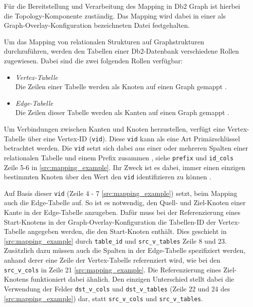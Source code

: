 Für die Bereitstellung und Verarbeitung des Mapping in Db2 Graph ist hierbei die Topology-Komponente zuständig. Das Mapping wird dabei in einer als Graph-Overlay-Konfiguration bezeichneten Datei festgehalten.  

Um das Mapping von relationalen Strukturen auf Graphstrukturen durchzuführen, werden den Tabellen einer Db2-Datenbank verschiedene Rollen zugewiesen. Dabei sind die zwei folgenden Rollen verfügbar:
\begin{itemize}
    \item \textit{Vertex-Tabelle}\\Die Zeilen einer Tabelle werden als Knoten auf einen Graph gemappt \cite{sigmod_tian, yt_tian}.
    \item \textit{Edge-Tabelle}\\Die Zeilen dieser Tabelle werden als Kanten auf einen Graph gemappt \cite{sigmod_tian, yt_tian}.
\end{itemize}

Um Verbindungen zwischen Kanten und Knoten herzustellen, verfügt eine Vertex-Tabelle über eine Vertex-ID (\texttt{\acs{vid}}). Diese \texttt{\acs{vid}} kann als eine Art Primärschlüssel betrachtet werden. Die \texttt{\acs{vid}} setzt sich dabei aus einer oder mehreren Spalten einer relationalen Tabelle und einem Prefix zusammen \cite{sigmod_tian, yt_tian}, siehe \texttt{prefix} und \texttt{id\_cols} Zeile 5-6 in \autoref{src:mapping_example}. Ihr Zweck ist es dabei, immer einen einzigen bestimmten Knoten über den Wert den \texttt{\acs{vid}} identifizieren zu können \cite{sigmod_tian, yt_tian}. 

Auf Basis dieser \texttt{\acs{vid}} (Zeile 4 - 7 \autoref{src:mapping_example}) setzt, beim Mapping auch die Edge-Tabelle auf. So ist es notwendig, den Quell- und Ziel-Knoten einer Kante in der Edge-Tabelle anzugeben. Dafür muss bei der Referenzierung eines Start-Knotens in der Graph-Overlay-Konfiguration die Tabellen-ID der Vertex-Tabelle angegeben werden, die den Start-Knoten enthält. Dies geschieht in \autoref{src:mapping_example} durch \texttt{table\_id} und \texttt{src\_v\_tables} Zeile 8 und 23. Zusätzlich dazu müssen auch die Spalten in der Edge-Tabelle spezifiziert werden, anhand derer eine Zeile der Vertex-Tabelle referenziert wird, wie bei den \texttt{src\_v\_cols} in Zeile 21 \autoref{src:mapping_example}. Die Referenzierung eines Ziel-Knotens funktioniert dabei ähnlich. Den einzigen Unterschied stellt dabei die Verwendung der Felder \texttt{dst\_v\_cols} und \texttt{dst\_v\_tables} (Zeile 22 und 24 des \autoref{src:mapping_example}) dar, statt \texttt{src\_v\_cols} und \texttt{src\_v\_tables}.

